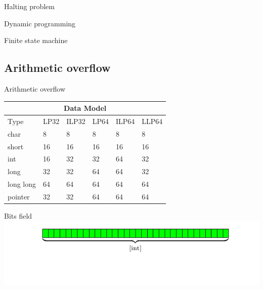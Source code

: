 \documentclass{beamer}
\begin{document}
\begin{CJK*}{UTF8}{bsmi}
    \begin{frame}{Halting problem}

    \end{frame}

    \begin{frame}{Dynamic programming}

    \end{frame}

    \begin{frame}{Finite state machine}

    \end{frame}

    \subsection{Arithmetic overflow}
    \begin{frame}{Arithmetic overflow}
        \centering
        \begin{tabular}{ |p{2cm}||p{1cm}|p{1cm}|p{1cm}|p{1cm}|p{1cm}|  }
            \hline
            \multicolumn{6}{|c|}{Data Model}                \\
            \hline
            Type      & LP32 & ILP32 & LP64 & ILP64 & LLP64 \\
            \hline
            char      & 8    & 8     & 8    & 8     & 8     \\
            short     & 16   & 16    & 16   & 16    & 16    \\
            int       & 16   & 32    & 32   & 64    & 32    \\
            long      & 32   & 32    & 64   & 64    & 32    \\
            long long & 64   & 64    & 64   & 64    & 64    \\
            pointer   & 32   & 32    & 64   & 64    & 64    \\
            \hline
        \end{tabular}
    \end{frame}

    \begin{frame}{Bits field}
        \centering
        \includegraphics[width=\textwidth]{src/mem_layout/mem.pdf}
    \end{frame}


\end{CJK*}
\end{document}
